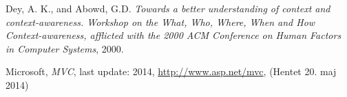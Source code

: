 \documentclass[../report.tex]{subfiles}
\begin{document}
\graphicspath{{img/}{../img/}}
\begingroup
\renewcommand{\chapter}[2]{}%
\begin{thebibliography}{}

  Dey, A. K., and Abowd, G.D.
  \emph{Towards a better understanding of context and context-awareness. Workshop on the What, Who, Where, When and How Context-awareness, afflicted with the 2000 ACM Conference on Human Factors in Computer Systems},
  2000. 

Microsoft, \textit{MVC}, last update: 2014, \url{http://www.asp.net/mvc}, (Hentet  20. maj 2014)


\end{thebibliography}
\endgroup
\end{document}

